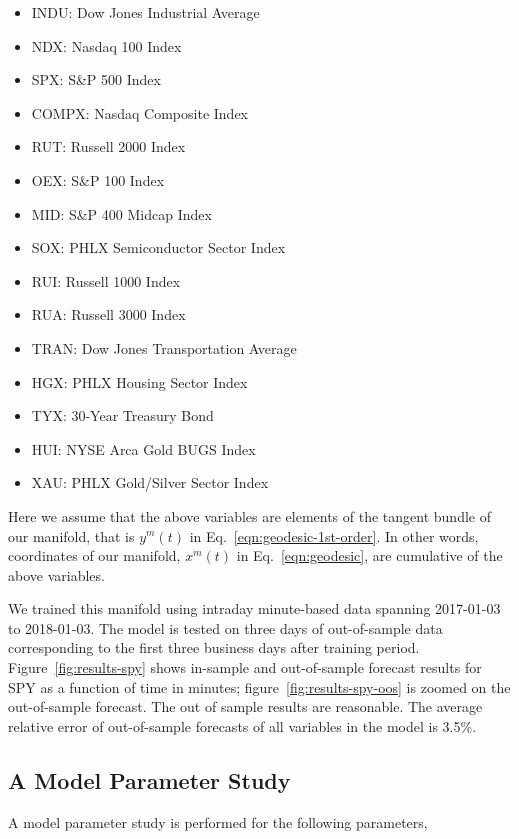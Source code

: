 \documentclass{article}
\begin{document}
\begin{itemize}
    \item[] INDU:  Dow Jones Industrial Average 
    \item[] NDX:   Nasdaq 100 Index 
    \item[] SPX:   S\&P 500 Index 
    \item[] COMPX: Nasdaq Composite Index 
    \item[] RUT:   Russell 2000 Index 
    \item[] OEX:   S\&P 100 Index 
    \item[] MID:   S\&P 400 Midcap Index 
    \item[] SOX:   PHLX Semiconductor Sector Index 
    \item[] RUI:   Russell 1000 Index 
    \item[] RUA:   Russell 3000 Index 
    \item[] TRAN:  Dow Jones Transportation Average 
    \item[] HGX:   PHLX Housing Sector Index 
    \item[] TYX:   30-Year Treasury Bond 
    \item[] HUI:   NYSE Arca Gold BUGS Index 
    \item[] XAU:   PHLX Gold/Silver Sector Index
\end{itemize}

Here we assume that the above variables are elements of the tangent
bundle of our manifold, that is $y^{m}(t)$ in
Eq.~\ref{eqn:geodesic-1st-order}. In other words, coordinates of our
manifold, $x^{m}(t)$ in Eq.~\ref{eqn:geodesic}, are cumulative of the
above variables.

We trained this manifold using intraday minute-based data spanning
2017-01-03 to 2018-01-03. The model is tested on three days of
out-of-sample data corresponding to the first three business days
after training period. Figure~\ref{fig:results-spy} shows in-sample
and out-of-sample forecast results for SPY as a function of time in
minutes; figure~\ref{fig:results-spy-oos} is zoomed on the
out-of-sample forecast. The out of sample results are reasonable. The
average relative error of out-of-sample forecasts of all variables in
the model is 3.5\%.

\subsection{A Model Parameter Study}\label{subsection:model-parameter-study}

A model parameter study is performed for the following parameters,
\end{document}
